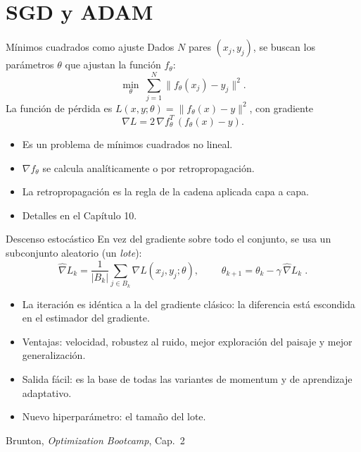 \documentclass[10pt,aspectratio=169]{beamer}
\newcommand{\fuente}{\vfill{\scriptsize\color{gray}Brunton, \emph{Optimization Bootcamp}, Cap.~2}}
\begin{document}
\section{SGD y ADAM}

\begin{frame}{Mínimos cuadrados como ajuste}
  \small
  Dados $N$ pares $(x_j,y_j)$, se buscan los parámetros $\theta$ que ajustan la función
  $f_\theta$:
  \[
    \min_{\theta}\;\sum_{j=1}^{N}\big\|f_\theta(x_j)-y_j\big\|^{2}.
  \]
  La función de pérdida es $L(x,y;\theta)=\|f_\theta(x)-y\|^{2}$, con gradiente
  \[
    \nabla L=2\,\nabla f_\theta^{T}\,(f_\theta(x)-y).
  \]
  \begin{itemize}
    \item Es un problema de mínimos cuadrados no lineal.
    \item $\nabla f_\theta$ se calcula analíticamente o por retropropagación.
    \item La retropropagación es la regla de la cadena aplicada capa a capa.
    \item Detalles en el Capítulo 10.
  \end{itemize}
\end{frame}

\begin{frame}{Descenso estocástico}
  \small
  En vez del gradiente sobre todo el conjunto, se usa un subconjunto aleatorio
  (un \emph{lote}):
  \[
    \hat\nabla L_k=\frac{1}{|B_k|}\sum_{j\in B_k}\nabla L(x_j,y_j;\theta),
    \qquad
    \boxed{\;\theta_{k+1}=\theta_k-\gamma\,\hat\nabla L_k\;}.
  \]
  \begin{itemize}
    \item La iteración es idéntica a la del gradiente clásico:
      la diferencia está escondida en el estimador del gradiente.
    \item Ventajas: velocidad, robustez al ruido, mejor exploración del
      paisaje y mejor generalización.
    \item Salida fácil: es la base de todas las variantes de momentum y
      de aprendizaje adaptativo.
    \item Nuevo hiperparámetro: el tamaño del lote.
  \end{itemize}
  \fuente
\end{frame}
\end{document}
